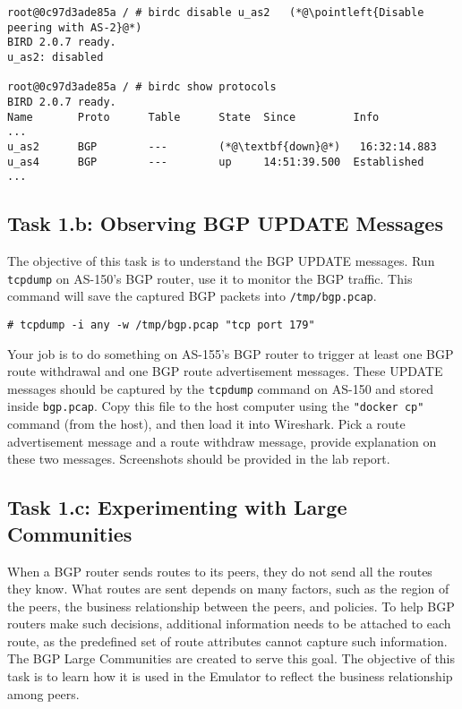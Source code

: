 \begin{itemize}
\begin{lstlisting}
root@0c97d3ade85a / # birdc disable u_as2   (*@\pointleft{Disable peering with AS-2}@*) 
BIRD 2.0.7 ready.
u_as2: disabled

root@0c97d3ade85a / # birdc show protocols
BIRD 2.0.7 ready.
Name       Proto      Table      State  Since         Info
...
u_as2      BGP        ---        (*@\textbf{down}@*)   16:32:14.883
u_as4      BGP        ---        up     14:51:39.500  Established
...
\end{lstlisting}

\end{itemize}


\subsection{Task 1.b: Observing BGP UPDATE Messages} 

The objective of this task is to understand the BGP UPDATE messages. 
Run \texttt{tcpdump} on AS-150's BGP router,
use it to monitor the BGP traffic. This command will save the 
captured BGP packets into \texttt{/tmp/bgp.pcap}.  

\begin{lstlisting}
# tcpdump -i any -w /tmp/bgp.pcap "tcp port 179"
\end{lstlisting}

Your job is to do something on AS-155's BGP router to trigger
at least one BGP route withdrawal and one BGP route advertisement
messages. These UPDATE messages should be captured by
the \texttt{tcpdump} command on AS-150 and stored inside \texttt{bgp.pcap}.
Copy this file to the host computer using the \texttt{"docker cp"} command (from the host),
and then load it into Wireshark. 
Pick a route advertisement message and a route withdraw message, provide
explanation on these two messages. Screenshots should be provided in the 
lab report.



\subsection{Task 1.c: Experimenting with Large Communities} 

When a BGP router sends routes to its peers, they do not send all the routes they
know. What routes are sent depends on many factors, such as the
region of the peers, the business relationship between the peers,
and policies. To help BGP routers make such decisions, additional
information needs to be attached to each route, as the predefined
set of route attributes cannot capture such information.
The BGP Large Communities are created to serve this goal.
The objective of this task is to learn how it is used 
in the Emulator to reflect the business relationship
among peers. 

